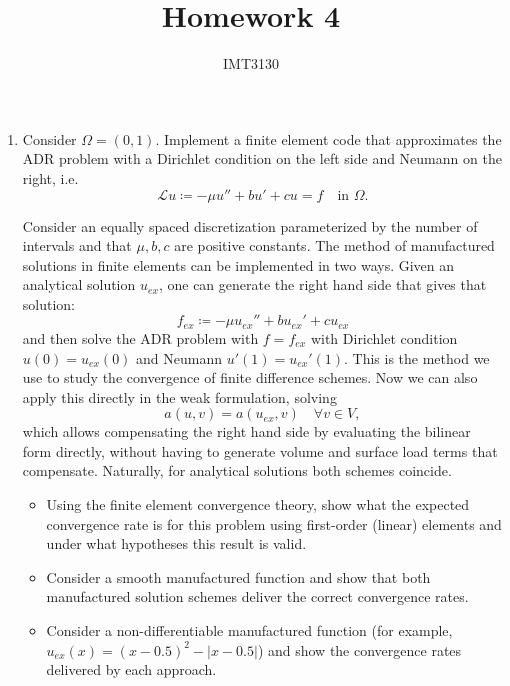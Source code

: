 \documentclass{article}
\title{Homework 4}
\author{}
\date{IMT3130}
\begin{document}
\maketitle

\instruccion

\begin{enumerate}
    \item Consider $\Omega = (0,1)$. Implement a finite element code that approximates the ADR problem with a Dirichlet condition on the left side and Neumann on the right, i.e.
        $$ \mathcal L u \coloneqq -\mu u'' + b u' + c u = f \quad \text{in $\Omega$}.$$

        Consider an equally spaced discretization parameterized by the number of intervals and that $\mu, b, c$ are positive constants. The method of manufactured solutions in finite elements can be implemented in two ways. Given an analytical solution $u_{ex}$, one can generate the right hand side that gives that solution: 
            $$ f_{ex} \coloneqq -\mu u_{ex}'' + b u_{ex}' + c u_{ex} $$
            and then solve the ADR problem with $f = f_{ex}$ with Dirichlet condition $u(0)=u_{ex}(0)$ and Neumann $u'(1) = u_{ex}'(1)$. This is the method we use to study the convergence of finite difference schemes. Now we can also apply this directly in the weak formulation, solving 
            $$ a(u,v) = a(u_{ex}, v) \quad \forall v \in V,$$
                which allows compensating the right hand side by evaluating the bilinear form directly, without having to generate volume and surface load terms that compensate. Naturally, for analytical solutions both schemes coincide.

        \begin{itemize}
            \item{} Using the finite element convergence theory, show what the expected convergence rate is for this problem using first-order (linear) elements and under what hypotheses this result is valid.
            \item{} Consider a smooth manufactured function and show that both manufactured solution schemes deliver the correct convergence rates. 
            \item{} Consider a non-differentiable manufactured function (for example, $u_{ex}(x) = (x-0.5)^2 - |x-0.5|$) and show the convergence rates delivered by each approach. 
        \end{itemize}


\end{enumerate}
\end{document}
